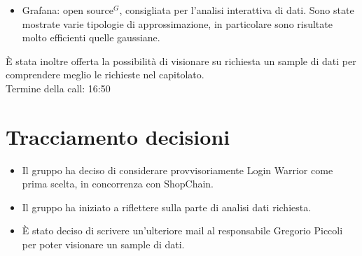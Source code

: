 \begin{itemize}
	\item Grafana: open source$^{G}$, consigliata per l'analisi interattiva di dati. Sono state mostrate varie tipologie di approssimazione, in particolare sono risultate molto efficienti quelle gaussiane.
\end{itemize}

\noindent 
\`E stata inoltre offerta la possibilità di visionare su richiesta un sample di dati per comprendere meglio le richieste nel capitolato. \\
Termine della call: 16:50

\section{Tracciamento decisioni}

\begin{itemize}
	\item Il gruppo ha deciso di considerare provvisoriamente Login Warrior come prima scelta, in concorrenza con ShopChain.
	\item Il gruppo ha iniziato a riflettere sulla parte di analisi dati richiesta.
	\item \`E stato deciso di scrivere un'ulteriore mail al responsabile Gregorio Piccoli per poter visionare un sample di dati.
\end{itemize}